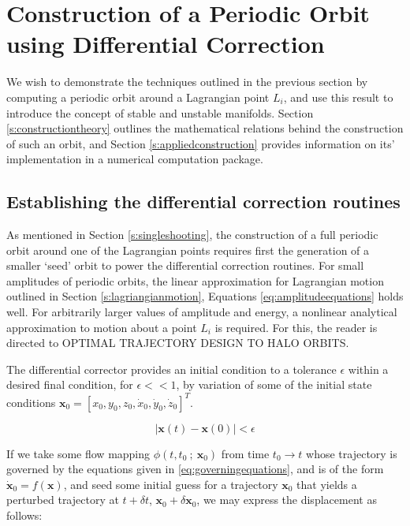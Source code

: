 \section{Construction of a Periodic Orbit using Differential Correction}

We wish to demonstrate the techniques outlined in the previous section by computing a periodic orbit around a Lagrangian point $L_i$, and use this result to introduce the concept of stable and unstable manifolds. Section \ref{s:constructiontheory} outlines the mathematical relations behind the construction of such an orbit, and Section \ref{s:appliedconstruction} provides information on its' implementation in a numerical computation package.

\subsection{Establishing the differential correction routines}

As mentioned in Section \ref{s:singleshooting}, the construction of a full periodic orbit around one of the Lagrangian points requires first the generation of a smaller `seed' orbit to power the differential correction routines. For small amplitudes of periodic orbits, the linear approximation for Lagrangian motion outlined in Section \ref{s:lagriangianmotion}, Equations \ref{eq:amplitudeequations} holds well. For arbitrarily larger values of amplitude and energy, a nonlinear analytical approximation to motion about a point $L_i$ is required. For this, the reader is directed to OPTIMAL TRAJECTORY DESIGN TO HALO ORBITS. 

The differential corrector provides an initial condition to a tolerance $\epsilon$ within a desired final condition, for $\epsilon << 1$, by variation of some of the initial state conditions $\pmb{x}_0 = [x_0, y_0, z_0, \dot{x}_0, \dot{y}_0, \dot{z}_0]^T$.

\begin{equation}
| \pmb{x}(t) - \pmb{x}(0) | < \epsilon
\end{equation}

If we take some flow mapping $\phi(t, t_0~;~\pmb{x}_0)$ from time $t_0 \rightarrow t$ whose trajectory is governed by the equations given in \ref{eq:governingequations}, and is of the form $\dot{\pmb{x}}_0 = f(\pmb{x})$, and seed some initial guess for a trajectory $\pmb{x}_0$ that yields a perturbed trajectory at $t+\delta t$, $\pmb{x}_0 + \delta \pmb{x}_0$, we may express the displacement as follows:

